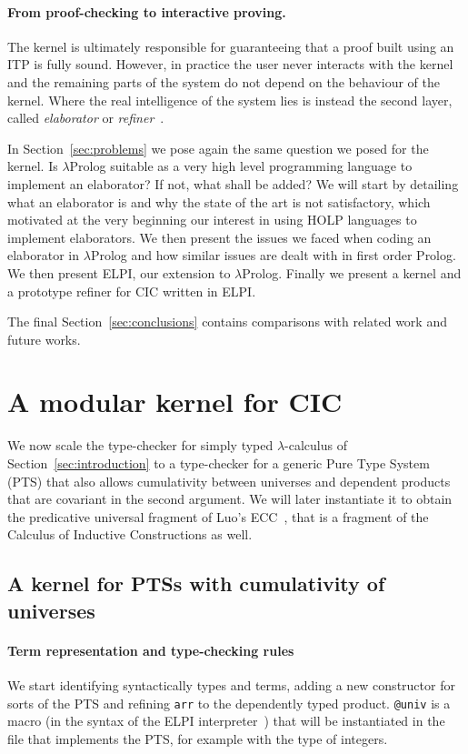 \documentclass{easychair}
\begin{document}
\paragraph{From proof-checking to interactive proving.}

The kernel is ultimately responsible for guaranteeing that a proof
built using an ITP is fully sound. However, in practice the user never
interacts with the kernel and the remaining parts of the system do not
depend on the behaviour of the kernel. Where the real intelligence of
the system lies is instead the second layer, called \emph{elaborator}
or \emph{refiner}~\cite{??,??,??}.

In Section~\ref{sec:problems} we pose again the same question we posed for the kernel. Is $\lambda$Prolog suitable as a very high level programming language to implement an elaborator? If not, what shall be added?
We will start by detailing what an elaborator is and why the state of the art is not satisfactory, which motivated at the very beginning our interest in using HOLP languages to implement elaborators. We then present the issues we faced when coding an elaborator in $\lambda$Prolog and how similar issues are dealt with in first order Prolog. We then present ELPI, our extension to $\lambda$Prolog.  Finally we present a kernel and a prototype refiner for CIC written in ELPI.

The final Section~\ref{sec:conclusions} contains comparisons with related work and future works.

\section{A modular kernel for CIC}\label{sec:kernel}

We now scale the type-checker for simply typed $\lambda$-calculus of Section~\ref{sec:introduction} to a type-checker for a generic Pure Type System (PTS) that also allows cumulativity between universes and dependent products that are covariant in the second argument. We will later instantiate it to obtain the predicative universal fragment of Luo's ECC~\cite{???}, that is a fragment of the Calculus of Inductive Constructions as well.

\subsection{A kernel for PTSs with cumulativity of universes}\label{sec:kernelpts}
\paragraph{Term representation and type-checking rules}
We start identifying syntactically types and terms, adding a new constructor for sorts of the PTS and refining \verb+arr+ to the dependently typed product.
\verb+@univ+ is a macro (in the syntax of the ELPI interpreter~\cite{??}) that will be instantiated in the file that implements the PTS, for example with the type of integers.
\end{document}
